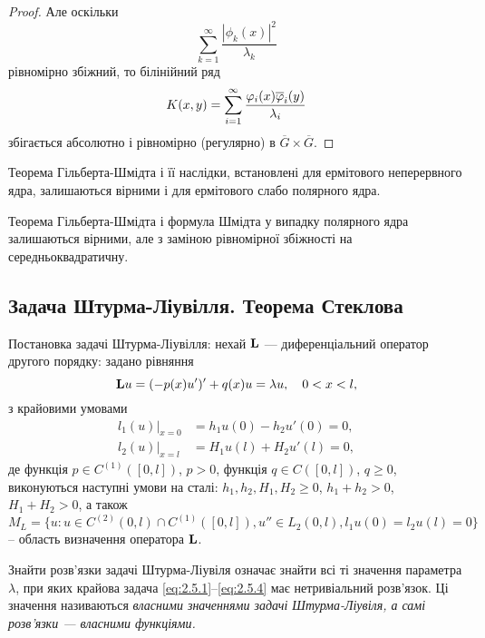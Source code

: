 \begin{proof}
    Але оскільки
    \begin{equation}
        \sum_{k=1}^\infty\frac{|\phi_k(x)|^2}{\lambda_k}
    \end{equation}
    рівномірно збіжний, то білінійний ряд
    \begin{equation}
        K(x,y)=\Sum_{i=1}^\infty\dfrac{\phi_i(x)\overline\phi_i(y)}{\lambda_i}
    \end{equation}
    збігається абсолютно і рівномірно (регулярно) в $\overline G\times\overline G$.
\end{proof}

\begin{remark}
    Теорема Гільберта-Шмідта і її наслідки, встановлені для ермітового неперервного ядра, залишаються вірними і для ермітового слабо полярного ядра.
\end{remark}

\begin{remark}
    Теорема Гільберта-Шмідта і формула Шмідта у випадку полярного ядра залишаються вірними, але з заміною рівномірної збіжності на середньоквадратичну.
\end{remark}

\subsection{Задача Штурма-Ліувілля. Теорема Стеклова}

Постановка задачі Штурма-Ліувілля: нехай $\bf{L}$ --- диференціальний оператор другого порядку: задано рівняння
\begin{equation}
    \label{eq:2.5.1}
    \bf{L}u=(-p(x)u')'+q(x)u=\lambda u,\quad0<x<l,
\end{equation}
з крайовими умовами
\begin{align}
    \label{eq:2.5.2}
    l_1(u)|_{x=0}&=h_1u(0)-h_2u'(0)=0,\\
    \label{eq:2.5.3}
    l_2(u)|_{x=l}&=H_1u(l)+H_2u'(l)=0,
\end{align}
де функція $p\in C^{(1)}([0,l])$, $p>0$, функція $q\in C([0,l])$, $q\ge0$, виконуються наступні умови на сталі: $h_1, h_2, H_1, H_2 \ge 0$, $h_1+h_2>0$, $H_1+H_2>0$,
а також
\begin{equation}
    \label{eq:2.5.4}
    M_L=\{u:u\in C^{(2)}(0,l)\cap C^{(1)}([0,l]), u''\in L_2(0,l), l_1u(0)=l_2u(l)=0\}
\end{equation}
-- область визначення оператора $\bf{L}$.

\begin{definition}
    Знайти розв'язки задачі Штурма-Ліувіля означає знайти всі ті значення параметра $\lambda$, при яких крайова задача \eqref{eq:2.5.1}--\eqref{eq:2.5.4} має нетривіальний розв'язок. Ці значення називаються \it{власними значеннями} задачі Штурма-Ліувіля, а самі розв'язки --- \it{власними функціями}.
\end{definition}

